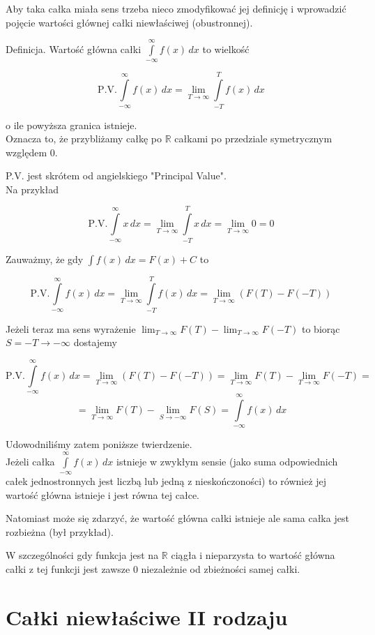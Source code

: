 \documentclass[12pt]{article}
\begin{document}
Aby taka całka miała sens trzeba nieco zmodyfikować jej definicję i wprowadzić pojęcie wartości głównej całki niewłaściwej (obustronnej).

Definicja. Wartość główna całki $ \int\limits_{-\infty}^{\infty} f(x) \,dx $ to wielkość

$$ \textrm{P.V.} \int\limits_{-\infty}^{\infty} f(x) \,dx = \lim_{T \to \infty} \int\limits_{-T}^{T} f(x) \,dx $$

o ile powyższa granica istnieje. \\

Oznacza to, że przybliżamy całkę po $\mathbb{R}$ całkami po przedziale symetrycznym względem 0.

P.V. jest skrótem od angielskiego "Principal Value". \\

Na przykład 

$$ \textrm{P.V.} \int\limits_{-\infty}^{\infty} x \,dx = \lim_{T \to \infty} \int\limits_{-T}^{T} x\,dx
= \lim_{T \to \infty} 0 = 0 $$

Zauważmy, że gdy $ \int f(x) \,dx = F(x) + C $ to

$$ \textrm{P.V.} \int\limits_{-\infty}^{\infty} f(x) \,dx = \lim_{T \to \infty} \int\limits_{-T}^{T} f(x) \,dx
= \lim_{T \to \infty} (F(T) - F(-T)) $$

Jeżeli teraz ma sens wyrażenie $ \lim_{T \to \infty} F(T ) - \lim_{T \to \infty} F(-T) $ to biorąc $ S = -T \to -\infty $ dostajemy

$$ \textrm{P.V.} \int\limits_{-\infty}^{\infty} f(x) \,dx = \lim_{T \to \infty} (F(T) - F(-T)) = 
\lim_{T \to \infty} F(T) - \lim_{T \to \infty} F(-T) = $$ $$ =  \lim_{T \to \infty} F(T) - \lim_{S \to -\infty} F(S)
= \int\limits_{-\infty}^{\infty} f(x) \,dx $$

Udowodniliśmy zatem poniższe twierdzenie. \\

Jeżeli całka $ \int\limits_{-\infty}^{\infty} f(x) \,dx $ istnieje w zwykłym sensie (jako suma odpowiednich całek jednostronnych
jest liczbą lub jedną z nieskończoności) to również jej wartość główna istnieje i jest równa tej całce.

Natomiast może się zdarzyć, że wartość główna całki istnieje ale sama całka jest rozbieżna (był przykład).

W szczególności gdy funkcja jest na $\mathbb{R}$ ciągła i nieparzysta to wartość główna całki z tej funkcji jest zawsze
0 niezależnie od zbieżności samej całki.

\section{Całki niewłaściwe II rodzaju}
\end{document}
